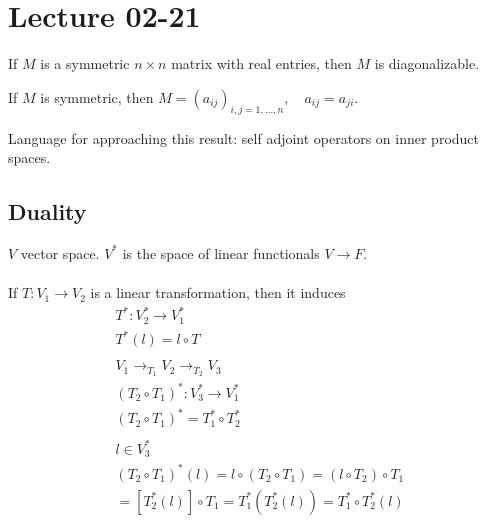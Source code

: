 \documentclass[class=scrartcl, crop=false]{standalone}
\date{2020-02-21}
\begin{document}
\section{Lecture 02-21}

\begin{theorem}
  If $M$ is a symmetric $n \times n$ matrix with real entries, then $M$ is diagonalizable. 
\end{theorem} 

If $M$ is symmetric, then $M = (a_{ij})_{i, j = 1, \dots, n}, \quad a_{ij} = a_{ji}$.

Language for approaching this result: self adjoint operators on inner product spaces.

\subsection{Duality}
$V$ vector space. $V^*$ is the space of linear functionals $V \to F$.
\\\\
If $T: V_1 \to V_2$ is a linear transformation, then it induces 
\begin{gather*}
  T^*: V_2^* \to V_1^* \\
  T^*(l) = l \circ T \\\\
  V_1 \to_{T_1} V_2 \to_{T_2} V_3 \\
  (T_2 \circ T_1)^* : V_3^* \to V_1^* \\
  (T_2 \circ T_1)^* = T_1^* \circ T_2^* \\\\
  l \in V_3^* \\
  (T_2 \circ T_1)^*(l) = l \circ (T_2 \circ T_1) = (l \circ T_2) \circ T_1 \\
  = [T_2^*(l)] \circ T_1 = T_1^*(T_2^*(l)) = T_1^* \circ T_2^*(l)
\end{gather*} 
\end{document}
